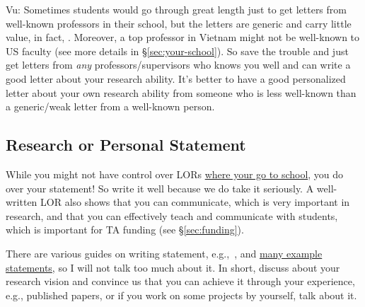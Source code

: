 \documentclass[11pt]{article}
\newenvironment{commentbox}{
 \small
    \begin{cbox}
 }{
   \end{cbox}
}
\newcommand{\red}[1]{{\color{red}{#1}}}
\begin{document}
\begin{commentbox}
Vu: Sometimes students would go through great length just to get letters from well-known professors in their school, but the letters are generic and carry little value, in fact, \red{red flags}. Moreover, a top professor in Vietnam might not be well-known to US faculty (see more details in \S\ref{sec:your-school}). So save the trouble and just get letters from \emph{any} professors/supervisors who knows you well and can write a good letter about your research ability. It's better to have a good personalized
letter about your own research ability from someone who is less
well-known than a generic/weak letter from a well-known person.
\end{commentbox}

\subsection{Research or Personal Statement}\label{sec:research-statement}

While you might not have control over LORs \hyperref[sec:your-school]{where your go to school}, you do over your
statement! So write it well because we do take it seriously.
A well-written LOR also shows that you can communicate, which is very important in research, and that you can effectively teach and communicate with students, which is important for TA funding (see \S\ref{sec:funding}).

There are various guides on writing statement, e.g.,~\cite{blattman2022writing}, and \href{https://cs-sop.org/}{many example statements},  so I will not talk too much about it. In short, discuss about your research vision and convince us that you can achieve it through your experience, e.g., published papers, or if you work on some projects by yourself, talk about it.
\end{document}
